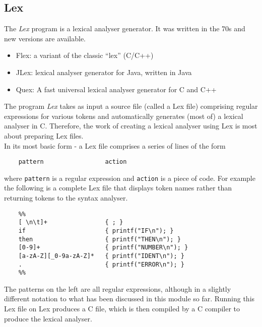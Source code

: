 \subsection{Lex}
The \textit{Lex} program is a lexical analyser generator. It was written in the 70s and new versions are available.
\begin{itemize}
    \item Flex: a variant of the classic ``lex'' (C/C++)
    \item JLex: lexical analyser generator for Java, written in Java
    \item Quex: A fast universal lexical analyser generator for C and C++
\end{itemize}
The program \textit{Lex} takes as input a source file (called a Lex file) comprising regular expressions for various tokens and automatically generates (most of) a lexical analyser in C. Therefore, the work of creating a lexical analyser using Lex is most about preparing Lex files.\\

In its most basic form - a Lex file comprises a series of lines of the form
\begin{verbatim}
    pattern                 action
\end{verbatim}
where \verb|pattern| is a regular expression and \verb|action| is a piece of code. For example the following is a complete Lex file that displays token names rather than returning tokens to the syntax analyser.
\begin{verbatim}
    %%
    [ \n\t]+                { ; }
    if                      { printf("IF\n"); }
    then                    { printf("THEN\n"); }
    [0-9]+                  { printf("NUMBER\n"); }
    [a-zA-Z][_0-9a-zA-Z]*   { printf("IDENT\n"); }
    .                       { printf("ERROR\n"); }
    %%
\end{verbatim}

The patterns on the left are all regular expressions, although in a slightly different notation to what has been discussed in this module so far. Running this Lex file on Lex produces a C file, which is then compiled by a C compiler to produce the lexical analyser. 
